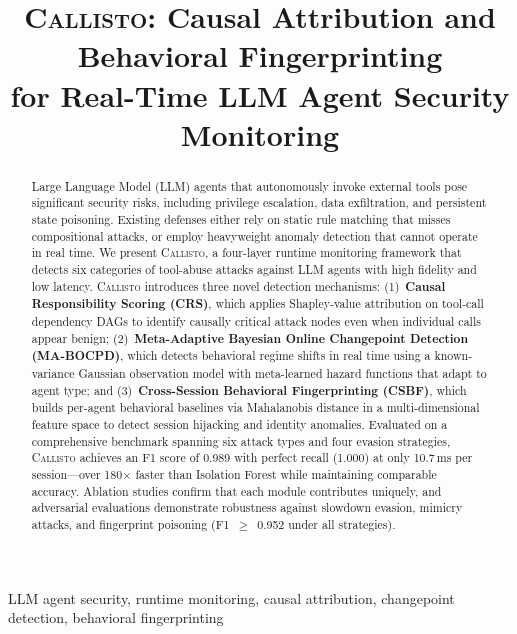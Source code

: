 \documentclass[conference,compsoc]{IEEEtran}
\newcommand{\system}{\textsc{Callisto}}
\begin{document}
\title{\system{}: Causal Attribution and Behavioral Fingerprinting\\for Real-Time LLM Agent Security Monitoring}

\author{
}

\maketitle

\begin{abstract}
Large Language Model (LLM) agents that autonomously invoke external tools pose significant security risks, including privilege escalation, data exfiltration, and persistent state poisoning. Existing defenses either rely on static rule matching that misses compositional attacks, or employ heavyweight anomaly detection that cannot operate in real time. We present \system{}, a four-layer runtime monitoring framework that detects six categories of tool-abuse attacks against LLM agents with high fidelity and low latency. \system{} introduces three novel detection mechanisms: (1)~\textbf{Causal Responsibility Scoring (CRS)}, which applies Shapley-value attribution on tool-call dependency DAGs to identify causally critical attack nodes even when individual calls appear benign; (2)~\textbf{Meta-Adaptive Bayesian Online Changepoint Detection (MA-BOCPD)}, which detects behavioral regime shifts in real time using a known-variance Gaussian observation model with meta-learned hazard functions that adapt to agent type; and (3)~\textbf{Cross-Session Behavioral Fingerprinting (CSBF)}, which builds per-agent behavioral baselines via Mahalanobis distance in a multi-dimensional feature space to detect session hijacking and identity anomalies. Evaluated on a comprehensive benchmark spanning six attack types and four evasion strategies, \system{} achieves an F1 score of 0.989 with perfect recall (1.000) at only 10.7\,ms per session---over 180$\times$ faster than Isolation Forest while maintaining comparable accuracy. Ablation studies confirm that each module contributes uniquely, and adversarial evaluations demonstrate robustness against slowdown evasion, mimicry attacks, and fingerprint poisoning (F1~$\geq$~0.952 under all strategies).
\end{abstract}

\begin{IEEEkeywords}
LLM agent security, runtime monitoring, causal attribution, changepoint detection, behavioral fingerprinting
\end{IEEEkeywords}
\end{document}
